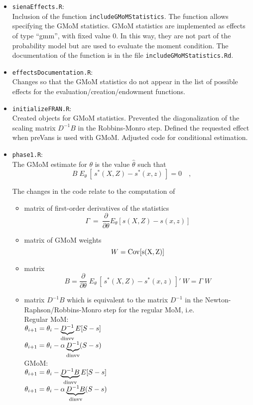 \documentclass[a4paper,11pt]{article}
\begin{document}
\begin{itemize}
\item \texttt{sienaEffects.R}:\\
Inclusion of the function \texttt{includeGMoMStatistics}. The function allows specifying the GMoM statistics. GMoM statistics are implemented as effects of type ``gmm'', with fixed value 0. In this way, they are not part of the probability model but are used to evaluate the moment condition. The documentation of the function is in the file \texttt{includeGMoMStatistics.Rd}.

\item \texttt{effectsDocumentation.R}:\\
Changes so that the GMoM statistics do not appear in the list of possible effects for the evaluation/creation/endowment functions.

\item \texttt{initializeFRAN.R}:\\
Created objects for GMoM statistics. Prevented the diagonalization of the scaling matrix $D^{-1}B$ in the Robbins-Monro step. Defined the requested effect when preVans is used with GMoM. Adjusted code for conditional estimation.

\item \texttt{phase1.R}:\\
The GMoM estimate for $\theta$ is the value $\hat{\theta}$ such that
\[B\;E_{\theta}\,[\,s^*(X,Z)-s^*(x,z)\,]=0\quad,\]
\noindent

The changes in the code relate to the computation of
\begin{itemize}
	\item matrix of first-order derivatives of the statistics
	\[\Gamma\ = \ \frac{\partial}{\partial\theta}E_{\theta}[s(X,Z)-s(x,z)]\]
	\medskip
  \item matrix of GMoM weights
	\[W=\rm{Cov}[s(X,Z)]\]
	\medskip
	\item matrix \[B=\frac{\partial}{\partial\theta}\;E_{\theta}\,[\,s^*(X,Z)-
s^*(x,z)\,]'\:W=\Gamma\; W\]
\medskip
\item matrix $D^{-1}B$ which is equivalent to the matrix $D^{-1}$ in the Newton-Raphson/Robbins-Monro step for the regular MoM, i.e.
\medskip\\
Regular MoM:\\
$\theta_{i+1}=\theta_{i}-\underbrace{D^{-1}}_{\rm{dinvv}}E[S-s]$\\
$\theta_{i+1}=\theta_{i}-\alpha\underbrace{D^{-1}}_{\rm{dinvv}}(S-s)$
\medskip\\
GMoM:\\
$\theta_{i+1}=\theta_{i}-\underbrace{D^{-1}B}_{\rm{dinvv}}E[S-s]$\\
$\theta_{i+1}=\theta_{i}-\alpha\underbrace{D^{-1}B}_{\rm{dinvv}}(S-s)$
\bigskip\\


\end{itemize}
\end{itemize}
\end{document}
